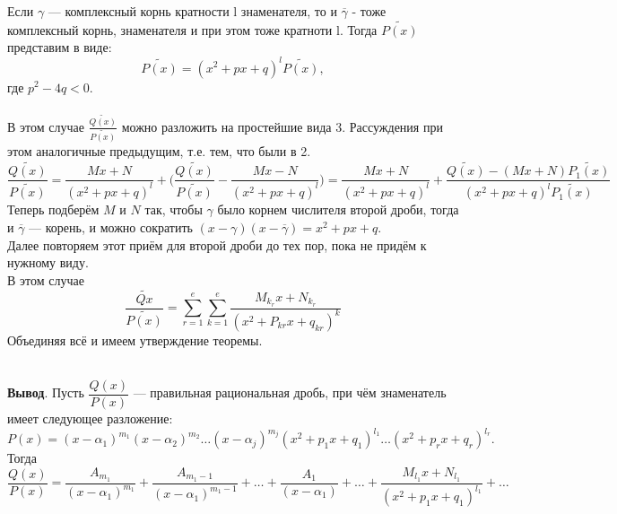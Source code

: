 \begin{Proof}
\begin{enumerate}
		Если $ \gamma $ --- комплексный корнь кратности l знаменателя, то и $ \overline{\gamma} $ - тоже комплексный корнь, знаменателя и при этом тоже кратноти l. Тогда $ \widetilde{P(x)} $ представим в виде: 
		$$ \widetilde{P(x)} = (x^2 + px + q)^l \widetilde{P(x)}, $$ где $ p^2 - 4q < 0 $.\\\\
		В этом случае $ \frac{\widetilde{Q(x)}}{\widetilde{P(x)}} $ можно разложить на простейшие вида 3. Рассуждения при этом аналогичные предыдущим, т.е. тем, что были в 2.
		$$ \frac{\widetilde{Q(x)}}{\widetilde{P(x)}} = \frac{Mx + N}{(x^2 + px + q)^l} + \Big(\frac{\widetilde{Q(x)}}{\widetilde{P(x)}} - \frac{Mx - N}{(x^2 + px + q)^l} \Big) = \frac{Mx + N}{(x^2 + px + q)^l} + \frac{\widetilde{Q(x)} - (Mx + N) \widetilde{P_1(x)}}{(x^2 + px +q)^l \widetilde{P_1(x)}} $$
		Теперь подберём $M$ и $N$ так, чтобы $ \gamma $ было корнем числителя второй дроби, тогда и $ \overline{\gamma}$ --- корень, и можно сократить $ (x -  \gamma)(x - \overline{\gamma}) = x^2 + px + q $.\\
		Далее повторяем этот приём для второй дроби до тех пор, пока не придём к нужному виду. \\
		В этом случае $$ \frac{\widetilde{Q{x}}}{\widetilde{P(x)}} = \sum\limits_{r = 1}^{e} \sum\limits_{k = 1}^{e} \frac{M_{k_{r}}x + N_{k_{r}}}{(x^2 + P_{kr}x + q_{kr})^k}$$
		Объединяя всё и имеем утверждение теоремы.
	\end{enumerate} 
\end{Proof}\\
\textbf{Вывод}.
Пусть $ \dfrac{Q(x)}{P(x)} $ --- правильная рациональная дробь, при чём знаменатель имеет следующее разложение:
$$ P(x) = (x - \alpha_1)^{m_1} (x - \alpha_2)^{m_2}\ldots(x - \alpha_j)^{m_j} (x^2 + p_1x + q_1)^{l_1} \ldots (x^2 + p_rx + q_r)^{l_r}.$$
Тогда $$ \frac{Q(x)}{P(x)} = \frac{A_{m_1}}{(x - \alpha_1)^{m_1}} + \frac{A_{m_1 - 1}}{(x - \alpha_1)^{m_1 - 1}} + \ldots + \frac{A_1}{(x - \alpha_1)} + \ldots + \frac{M_{l_1}x + N_{l_1}}{(x^2 + p_1x + q_1)^{l_1}} + \ldots$$
